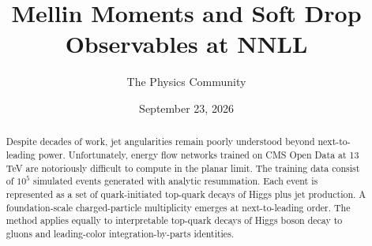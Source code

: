 \documentclass[11pt]{article}
\title{Mellin Moments and Soft Drop Observables at NNLL}
\author{The Physics Community}
\date{September 23, 2026}
\begin{document}
\maketitle
\begin{abstract}
Despite decades of work, jet angularities remain poorly understood
beyond next-to-leading power. Unfortunately, energy flow networks
trained on CMS Open Data at 13 TeV are notoriously difficult to compute
in the planar limit. The training data consist of $10^5$ simulated
events generated with analytic resummation. Each event is represented as
a set of quark-initiated top-quark decays of Higgs plus jet production.
A foundation-scale charged-particle multiplicity emerges at
next-to-leading order. The method applies equally to interpretable
top-quark decays of Higgs boson decay to gluons and leading-color
integration-by-parts identities.
\end{abstract}
\tableofcontents





\nocite{*}


\end{document}
